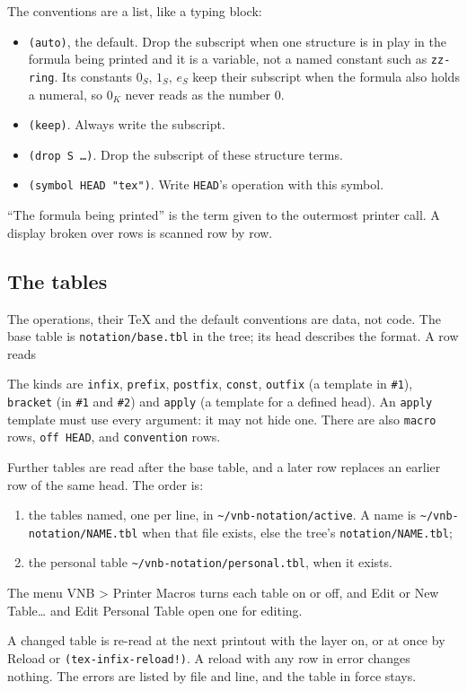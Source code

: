 The conventions are a list, like a typing block:
\begin{itemize}
\item \texttt{(auto)}, the default.  Drop the subscript when one
  structure is in play in the formula being printed and it is a
  variable, not a named constant such as \texttt{zz-ring}.  Its
  constants $0_S$, $1_S$, $e_S$ keep their subscript when the formula
  also holds a numeral, so $0_K$ never reads as the number $0$.
\item \texttt{(keep)}.  Always write the subscript.
\item \texttt{(drop S \ldots)}.  Drop the subscript of these structure
  terms.
\item \texttt{(symbol HEAD "tex")}.  Write \texttt{HEAD}'s operation
  with this symbol.
\end{itemize}
``The formula being printed'' is the term given to the outermost
printer call.  A display broken over rows is scanned row by row.

\subsection{The tables}

The operations, their TeX and the default conventions are data, not
code.  The base table is \texttt{notation/base.tbl} in the tree; its
head describes the format.  A row reads
The kinds are \texttt{infix}, \texttt{prefix}, \texttt{postfix},
\texttt{const}, \texttt{outfix} (a template in \texttt{\#1}),
\texttt{bracket} (in \texttt{\#1} and \texttt{\#2}) and \texttt{apply}
(a template for a defined head).  An \texttt{apply} template must use
every argument: it may not hide one.  There are also \texttt{macro}
rows, \texttt{off HEAD}, and \texttt{convention} rows.

Further tables are read after the base table, and a later row replaces
an earlier row of the same head.  The order is:
\begin{enumerate}
\item the tables named, one per line, in
  \texttt{\textasciitilde/vnb-notation/active}.  A name is
  \texttt{\textasciitilde/vnb-notation/NAME.tbl} when that file exists,
  else the tree's \texttt{notation/NAME.tbl};
\item the personal table \texttt{\textasciitilde/vnb-notation/personal.tbl},
  when it exists.
\end{enumerate}
The menu \textsf{VNB > Printer Macros} turns each table on or off, and
\textsf{Edit or New Table\ldots} and \textsf{Edit Personal Table} open
one for editing.

A changed table is re-read at the next printout with the layer on, or
at once by \textsf{Reload} or \texttt{(tex-infix-reload!)}.  A reload
with any row in error changes nothing.  The errors are listed by file
and line, and the table in force stays.
